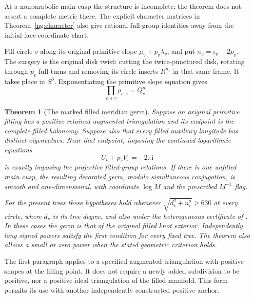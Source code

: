 \documentclass[11pt]{article}
\numberwithin{equation}{section}
\newtheorem{theorem}{Theorem}[section]
\theoremstyle{definition}\newtheorem{definition}[theorem]{Definition}
\theoremstyle{remark}\newtheorem{remark}[theorem]{Remark}
\newcommand{\ii}{\mathrm i}
\begin{document}
At a nonparabolic main cusp the structure is incomplete; the theorem
does not assert a complete metric there. The explicit character
matrices in Theorem~\ref{ng:character} also give rational full-group
identities away from the initial face-coordinate chart.

Fill circle $v$ along its original primitive slope
$\mu_v+p_v\lambda_v$, and put $n_v=\epsilon_v-2p_v$.
The surgery is the original disk twist: cutting the twice-punctured
disk, rotating through $p_v$ full turns and removing its circle inserts
$R^{n_v}$ in that same frame. It takes place in $S^3$.
Exponentiating the primitive slope equation gives
\begin{equation}\label{ng:T5}
             \prod_{e\ni v}\rho_{v,e}=Q_v^{n_v}.
\end{equation}

\begin{theorem}[The marked filled meridian germ]\label{ng:filled-germ}
Suppose an original primitive filling has a positive retained
augmented triangulation and its endpoint is the complete
filled holonomy. Suppose also that every filled auxiliary longitude
has distinct eigenvalues. Near that endpoint, imposing the continued
logarithmic equations
\begin{equation}\label{ng:A2}
                  U_v+p_vV_v=-2\pi\ii
\end{equation}
is exactly imposing the projective filled-group relations.
If there is one unfilled main cusp, the resulting decorated germ,
modulo simultaneous conjugation, is smooth and one-dimensional,
with coordinate $\log M$ and the prescribed $M^{-1}$ flag.

For the present trees these hypotheses hold whenever
$\sqrt{d_v^2+n_v^2}\ge630$ at every circle, where $d_v$ is its tree
degree, and also under the heterogeneous certificate of
\cite[Theorem~7.1]{Circle}. In these cases the germ is that of the
original filled knot exterior. Independently long signed powers
satisfy the first condition for every fixed tree. The theorem also
allows a small or zero power when the stated geometric criterion holds.
\end{theorem}

The first paragraph applies to a specified augmented triangulation
with positive shapes at the filling point. It does not require a newly added
subdivision to be positive, nor a positive ideal triangulation of the
filled manifold. This form permits its use with another independently
constructed positive anchor.
\end{document}
